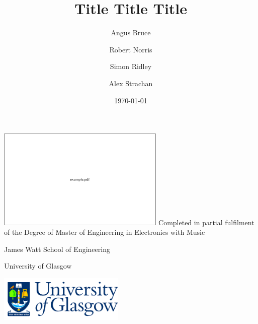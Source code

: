 \documentclass[a4paper]{article}
\title{Title Title Title}
\author{Angus Bruce \and Robert Norris \and Simon Ridley \and Alex Strachan}\date{\today}
\begin{document}
  \clearpage

  \maketitle
  \begin{center}
    \vfill
    \includegraphics[width=8cm]{Figures/example.pdf}
    \vfill
    Completed in partial fulfilment of the Degree of Master of Engineering in Electronics with Music

    \vspace{1.5cm}

    James Watt School of Engineering

    University of Glasgow

    \vfill
    \includegraphics[width=6cm]{Figures/logo-glasgow-university-1-transparent.png}
    \vfill
  \end{center}
  \thispagestyle{empty}

  \newpage
  \thispagestyle{empty}
  


  \newpage
  \thispagestyle{empty}
  


  \newpage
  \thispagestyle{empty}
  \tableofcontents
  \thispagestyle{empty}
  \listoffigures
  \thispagestyle{empty}
  \listoftables


  \newpage

  

  

  

  

  

  

  

  
\end{document}
